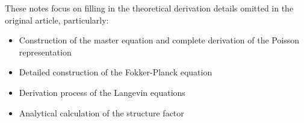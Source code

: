 These notes focus on filling in the theoretical derivation details omitted in the original article, particularly:
\begin{itemize}
    \item Construction of the master equation and complete derivation of the Poisson representation
    \item Detailed construction of the Fokker-Planck equation
    \item Derivation process of the Langevin equations
    \item Analytical calculation of the structure factor
\end{itemize}
